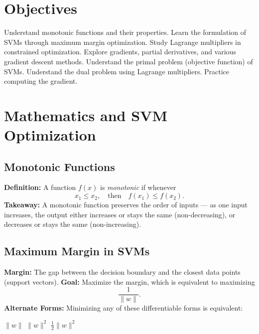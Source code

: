 
\section*{Objectives}
\begin{outline}
    \1 Understand monotonic functions and their properties.
    \1 Learn the formulation of SVMs through maximum margin optimization.
    \1 Study Lagrange multipliers in constrained optimization.
    \1 Explore gradients, partial derivatives, and various gradient descent methods.
    \1 Understand the primal problem (objective function) of SVMs.
    \1 Understand the dual problem using Lagrange multipliers.
    \1 Practice computing the gradient.
\end{outline}

\section{Mathematics and SVM Optimization}

\subsection{Monotonic Functions}
\begin{outline}
    \1 \textbf{Definition:} A function \( f(x) \) is \emph{monotonic} if whenever 
    \[
    x_1 \leq x_2, \quad \text{then} \quad f(x_1) \leq f(x_2).
    \]
    \1 \textbf{Takeaway:} A monotonic function preserves the order of inputs — as one input increases, the output either increases or stays the same (non-decreasing), or decreases or stays the same (non-increasing).
\end{outline}

\subsection{Maximum Margin in SVMs}
\begin{outline}
    \1 \textbf{Margin:} The gap between the decision boundary and the closest data points (support vectors).
    \1 \textbf{Goal:} Maximize the margin, which is equivalent to maximizing 
    \[
    \frac{1}{\|w\|}.
    \]
    \1 \textbf{Alternate Forms:} Minimizing any of these differentiable forms is equivalent:
    \begin{outline}
        \1 \(\|w\|\)
        \1 \(\|w\|^2\)
        \1 \(\frac{1}{2}\|w\|^2\)
    \end{outline}
\end{outline}

